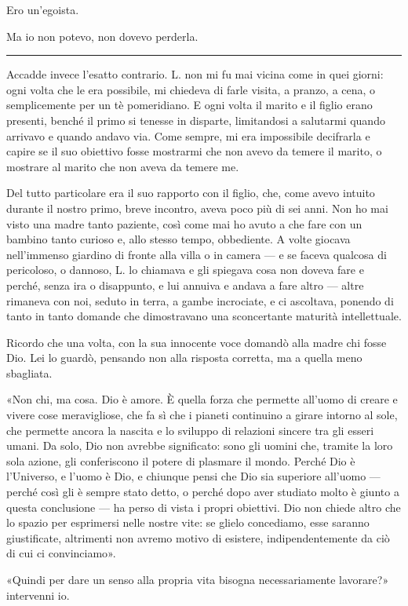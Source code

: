 \documentclass[a4paper,10pt]{memoir}
\begin{document}
Ero un'egoista.

Ma io non potevo, non dovevo perderla.

\plainbreak{1}

Accadde invece l'esatto contrario. L. non mi fu mai vicina come in quei giorni: ogni volta che le era possibile, mi
chiedeva di farle visita, a pranzo, a cena, o semplicemente per un tè pomeridiano. E ogni volta il marito e il figlio
erano presenti, benché il primo si tenesse in disparte, limitandosi a salutarmi quando arrivavo e quando andavo via.
Come sempre, mi era impossibile decifrarla e capire se il suo obiettivo fosse mostrarmi che non avevo da temere il
marito, o mostrare al marito che non aveva da temere me.

Del tutto particolare era il suo rapporto con il figlio, che, come avevo intuito durante il nostro primo, breve
incontro, aveva poco più di sei anni. Non ho mai visto una madre tanto paziente, così come mai ho avuto a che fare con
un bambino tanto curioso e, allo stesso tempo, obbediente. A volte giocava nell'immenso giardino di fronte alla villa o
in camera --- e se faceva qualcosa di pericoloso, o dannoso, L. lo chiamava e gli spiegava cosa non doveva fare e
perché, senza ira o disappunto, e lui annuiva e andava a fare altro --- altre rimaneva con noi, seduto in terra, a gambe
incrociate, e ci ascoltava, ponendo di tanto in tanto domande che dimostravano una sconcertante maturità intellettuale.

Ricordo che una volta, con la sua innocente voce domandò alla madre chi fosse Dio. Lei lo guardò, pensando non alla
risposta corretta, ma a quella meno sbagliata.

«Non chi, ma cosa. Dio è amore. È quella forza che permette all'uomo di creare e vivere cose meravigliose, che fa sì che
i pianeti continuino a girare intorno al sole, che permette ancora la nascita e lo sviluppo di relazioni sincere tra gli
esseri umani. Da solo, Dio non avrebbe significato: sono gli uomini che, tramite la loro sola azione, gli conferiscono
il potere di plasmare il mondo. Perché Dio è l'Universo, e l'uomo è Dio, e chiunque pensi che Dio sia superiore all'uomo
--- perché così gli è sempre stato detto, o perché dopo aver studiato molto è giunto a questa conclusione --- ha perso
di vista i propri obiettivi. Dio non chiede altro che lo spazio per esprimersi nelle nostre vite: se glielo concediamo,
esse saranno giustificate, altrimenti non avremo motivo di esistere, indipendentemente da ciò di cui ci convinciamo».

«Quindi per dare un senso alla propria vita bisogna necessariamente lavorare?» intervenni io.
\end{document}
